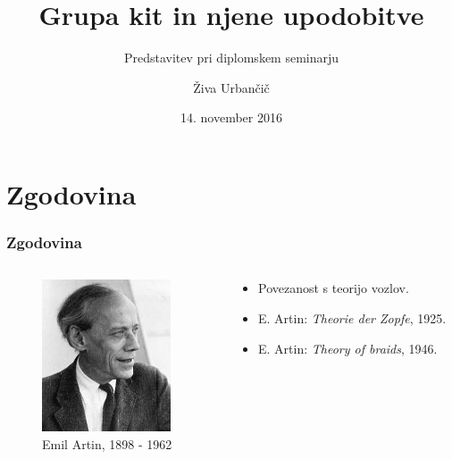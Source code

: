 \documentclass[9pt, table]{beamer}
\title[Grupa kit] {Grupa kit in njene upodobitve}
\subtitle{Predstavitev pri diplomskem seminarju}
\author{Živa Urbančič}
\institute[FMF] {Fakulteta za matematiko in fiziko}
\date{14. november 2016}
\theoremstyle{remark}
\theoremstyle{definition}
\begin{document}
\begin{frame}
  \titlepage
\end{frame}

\section{Zgodovina}
\begin{frame}
\frametitle{Zgodovina}
\begin{columns}
\begin{column}[T]{5cm}
\begin{figure}
\includegraphics[height = 4.5cm]{Emil_Artin}
\caption{Emil Artin, 1898 - 1962}
\end{figure}
\end{column}
\begin{column}[T]{5cm}
\begin{itemize}
\item Povezanost s teorijo vozlov.
\item E. Artin: \emph{Theorie der Zopfe}, 1925.
\item E. Artin: \emph{Theory of braids}, 1946.
\end{itemize}
\end{column}
\end{columns}
\end{frame}

\end{document}
